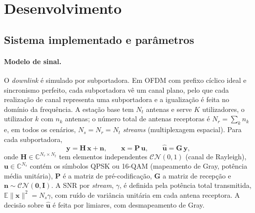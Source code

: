 \providecommand{\pend}{\textcolor{red}{\textbf{?}}}
\section{Desenvolvimento}
\label{sec:desenvolvimento}

\subsection{Sistema implementado e parâmetros}
\label{sec:sistema}

\paragraph{Modelo de sinal.}
O \emph{downlink} é simulado por subportadora. Em OFDM com prefixo cíclico ideal e sincronismo perfeito, cada subportadora vê um canal plano, pelo que cada realização de canal representa uma subportadora e a igualização é feita no domínio da frequência. A estação base tem $N_t$ antenas e serve $K$ utilizadores, o utilizador $k$ com $n_k$ antenas; o número total de antenas receptoras é $N_r=\sum_k n_k$ e, em todos os cenários, $N_s=N_r=N_t$ \emph{streams} (multiplexagem espacial). Para cada subportadora,
\begin{equation}
  \mathbf{y}=\mathbf{H}\,\mathbf{x}+\mathbf{n},\qquad \mathbf{x}=\mathbf{P}\,\mathbf{u},\qquad \hat{\mathbf{u}}=\mathbf{G}\,\mathbf{y},
  \label{eq:modelo}
\end{equation}
onde $\mathbf{H}\in\mathbb{C}^{N_r\times N_t}$ tem elementos independentes $\mathcal{CN}(0,1)$ (canal de Rayleigh), $\mathbf{u}\in\mathbb{C}^{N_s}$ contém os símbolos QPSK ou 16-QAM (mapeamento de Gray, potência média unitária), $\mathbf{P}$ é a matriz de pré-codificação, $\mathbf{G}$ a matriz de recepção e $\mathbf{n}\sim\mathcal{CN}(\mathbf{0},\mathbf{I})$. A SNR por \emph{stream}, $\gamma$, é definida pela potência total transmitida, $\mathbb{E}\|\mathbf{x}\|^2=N_s\gamma$, com ruído de variância unitária em cada antena receptora. A decisão sobre $\hat{\mathbf{u}}$ é feita por limiares, com desmapeamento de Gray.


